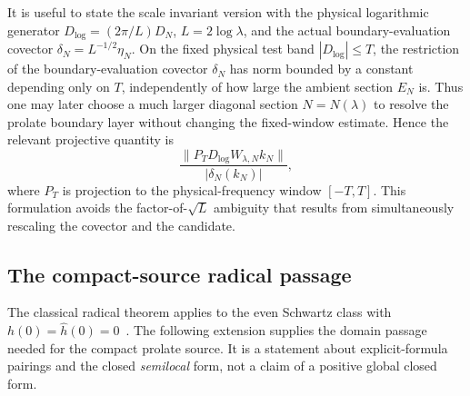 \documentclass[11pt]{article}
\theoremstyle{remark}
\begin{document}
It is useful to state the scale invariant version with the physical logarithmic generator $D_{\log}=(2\pi/L)D_N$, $L=2\log\lambda$, and the actual boundary-evaluation covector $\delta_N=L^{-1/2}\eta_N$.  On the fixed physical test band $|D_{\log}|\le T$, the restriction of the boundary-evaluation covector $\delta_N$ has norm bounded by a constant depending only on $T$, independently of how large the ambient section $E_N$ is.  Thus one may later choose a much larger diagonal section $N=N(\lambda)$ to resolve the prolate boundary layer without changing the fixed-window estimate.  Hence the relevant projective quantity is
\begin{equation}\label{eq:physical-projective-residual}
 \frac{\|P_TD_{\log}W_{\lambda,N}k_N\|}
 {|\delta_N(k_N)|},
\end{equation}
where $P_T$ is projection to the physical-frequency window $[-T,T]$.  This formulation avoids the factor-of-$\sqrt L$ ambiguity that results from simultaneously rescaling the covector and the candidate.

\subsection*{The compact-source radical passage}
The classical radical theorem applies to the even Schwartz class with
$h(0)=\widehat h(0)=0$~\cite[Section 3]{ConnesConsani2023}.
The following extension supplies the domain passage needed for the compact
prolate source. It is a statement about explicit-formula pairings and the
closed \emph{semilocal} form, not a claim of a positive global closed form.
\end{document}
